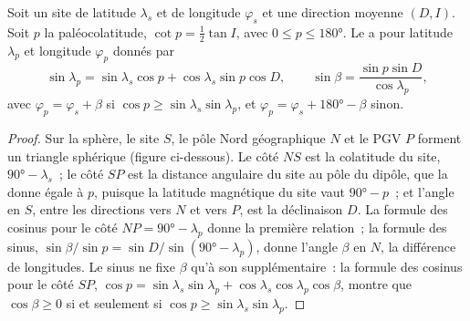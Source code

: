 \begin{theorem}\label{thm:b3:palaeomagnetism:pole}
Soit un site de latitude $\lambda_s$ et de longitude $\varphi_s$ et une
direction moyenne $(D, I)$. Soit $p$ la paléocolatitude, $\cot p = \tfrac12\tan I$,
avec $0 \le p \le \ang{180}$. Le  a pour latitude
$\lambda_p$ et longitude $\varphi_p$ donnés par
\[
  \sin\lambda_p = \sin\lambda_s\cos p + \cos\lambda_s\sin p\cos D,\qquad
  \sin\beta = \frac{\sin p\sin D}{\cos\lambda_p},
\]
avec $\varphi_p = \varphi_s + \beta$ si $\cos p \ge \sin\lambda_s\sin\lambda_p$,
et $\varphi_p = \varphi_s + \ang{180} - \beta$ sinon.
\end{theorem}

\begin{proof}
Sur la sphère, le site $S$, le pôle Nord géographique $N$ et le PGV $P$ forment un
triangle sphérique (figure ci-dessous). Le côté $NS$ est la colatitude du site,
$\ang{90} - \lambda_s$~; le côté $SP$ est la distance angulaire du site au
pôle du dipôle, que la  donne égale à $p$, puisque la
latitude magnétique du site vaut $\ang{90} - p$~; et l'angle en $S$, entre les
directions vers $N$ et vers $P$, est la déclinaison $D$. La formule des cosinus pour le
côté $NP = \ang{90} - \lambda_p$ donne la première relation~; la formule des sinus,
$\sin\beta/\sin p = \sin D/\sin(\ang{90} - \lambda_p)$, donne l'angle $\beta$
en $N$, la différence de longitudes. Le sinus ne fixe $\beta$ qu'à son
supplémentaire~: la formule des cosinus pour le côté $SP$, $\cos p = \sin\lambda_s
\sin\lambda_p + \cos\lambda_s\cos\lambda_p\cos\beta$, montre que $\cos\beta \ge
0$ si et seulement si $\cos p \ge \sin\lambda_s\sin\lambda_p$.
\end{proof}

